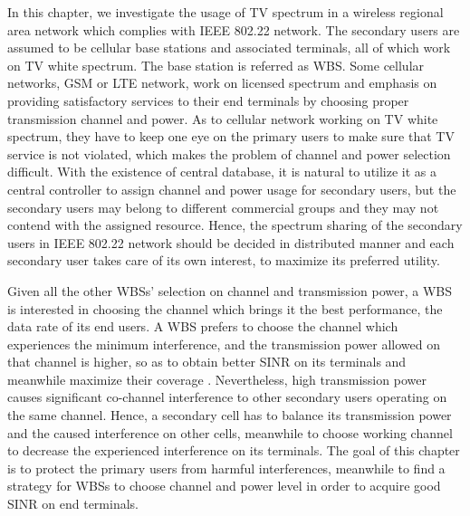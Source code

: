 

In this chapter, we investigate the usage of TV spectrum in a wireless regional area network which complies with IEEE 802.22 network.
The secondary users are assumed to be cellular base stations and associated terminals, all of which work on TV white spectrum. 
The base station is referred as WBS.
Some cellular networks, \ie GSM or LTE network, work on licensed spectrum and emphasis on providing satisfactory services to their end terminals by choosing proper transmission channel and power. 
As to cellular network working on TV white spectrum, they have to keep one eye on the primary users to make sure that TV service is not violated, which makes the problem of channel and power selection difficult.
With the existence of central database, it is natural to utilize it as a central controller to assign channel and power usage for secondary users, but the secondary users may belong to different commercial groups and they may not contend with the assigned resource.
Hence, the spectrum sharing of the secondary users in IEEE 802.22 network should be decided in distributed manner and each secondary user takes care of its own interest, \ie to maximize its preferred utility.

Given all the other WBSs' selection on channel and transmission power, a WBS is interested in choosing the channel which brings it the best performance, \ie the data rate of its end users.
A WBS prefers to choose the channel which experiences the minimum interference, and the transmission power allowed on that channel is higher, so as to obtain better SINR on its terminals and meanwhile maximize their coverage \cite{wuinfocom09, HoangPowerChannel2010}. 
Nevertheless, high transmission power causes significant co-channel interference to other secondary users operating on the same channel. 
Hence, a secondary cell has to balance its transmission power and the caused interference on other cells, meanwhile to choose working channel to decrease the experienced interference on its terminals. 
The goal of this chapter is to protect the primary users from harmful interferences, meanwhile to find a strategy for WBSs to choose channel and power level in order to acquire good SINR on end terminals.

